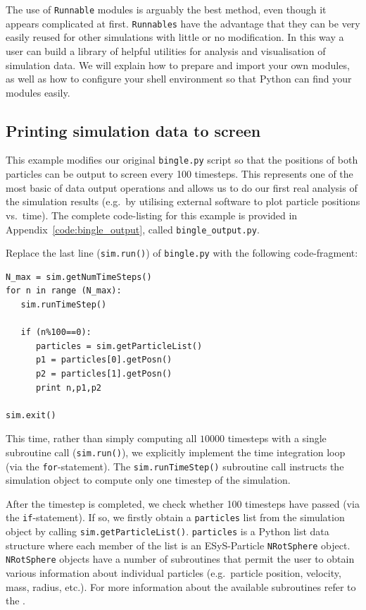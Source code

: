 \noindent
The use of \texttt{Runnable} modules is arguably the best method, even though it appears complicated at first. \texttt{Runnables} have the advantage that they can be very easily reused for other simulations with little or no modification. In this way a user can build a library of helpful utilities for analysis and visualisation of simulation data. We will explain how to prepare and import your own modules, as well as how to configure your shell environment so that Python can find your modules easily.

\subsection{Printing simulation data to screen}

This example modifies our original \texttt{bingle.py} script so that the positions of both particles can be output to screen every 100 timesteps. This represents one of the most basic of data output operations and allows us to do our first real analysis of the simulation results (e.g.\ by utilising external software to plot particle positions vs.\ time). The complete code-listing for this example is provided in Appendix~\ref{code:bingle_output}, called \texttt{bingle\_output.py}. 

Replace the last line (\texttt{sim.run()}) of \texttt{bingle.py} with the following code-fragment:

\begin{verbatim}
N_max = sim.getNumTimeSteps()
for n in range (N_max):
   sim.runTimeStep()

   if (n%100==0):
      particles = sim.getParticleList()
      p1 = particles[0].getPosn()
      p2 = particles[1].getPosn()
      print n,p1,p2

sim.exit()
\end{verbatim}

\noindent
This time, rather than simply computing all $10000$ timesteps with a single subroutine call (\texttt{sim.run()}), we explicitly implement the time integration loop (via the \texttt{for}-statement). The \texttt{sim.runTimeStep()} subroutine call instructs the simulation object to compute only one timestep of the simulation.  

After the timestep is completed, we check whether 100 timesteps have passed (via the \texttt{if}-statement). If so, we firstly obtain a \texttt{particles} list from the simulation object by calling \texttt{sim.getParticleList()}. \texttt{particles} is a Python list data structure where each member of the list is an ESyS-Particle \texttt{NRotSphere} object. \texttt{NRotSphere} objects have a number of subroutines that permit the user to obtain various information about individual particles (e.g.\ particle position, velocity, mass, radius, etc.). For more information about the available subroutines refer to the .


